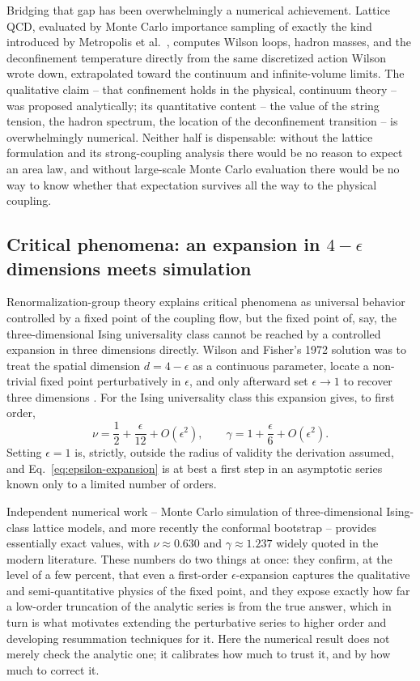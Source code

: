 Bridging that gap has been overwhelmingly a numerical achievement. Lattice QCD,
evaluated by Monte Carlo importance sampling of exactly the kind introduced by
Metropolis et al.\ \cite{Metropolis1953}, computes Wilson loops, hadron masses,
and the deconfinement temperature directly from the same discretized action
Wilson wrote down, extrapolated toward the continuum and infinite-volume
limits. The qualitative claim -- that confinement holds in the physical,
continuum theory -- was proposed analytically; its quantitative content -- the
value of the string tension, the hadron spectrum, the location of the
deconfinement transition -- is overwhelmingly numerical. Neither half is
dispensable: without the lattice formulation and its strong-coupling analysis
there would be no reason to expect an area law, and without large-scale Monte
Carlo evaluation there would be no way to know whether that expectation
survives all the way to the physical coupling.

\subsection{Critical phenomena: an expansion in $4-\epsilon$ dimensions meets simulation}

Renormalization-group theory explains critical phenomena as universal behavior
controlled by a fixed point of the coupling flow, but the fixed point of, say,
the three-dimensional Ising universality class cannot be reached by a
controlled expansion in three dimensions directly. Wilson and Fisher's 1972
solution was to treat the spatial dimension $d = 4-\epsilon$ as a continuous
parameter, locate a non-trivial fixed point perturbatively in $\epsilon$, and
only afterward set $\epsilon \to 1$ to recover three dimensions
\cite{WilsonFisher1972,WilsonKogut1974}. For the Ising universality class this
expansion gives, to first order,
\begin{equation}
\nu = \frac{1}{2} + \frac{\epsilon}{12} + O(\epsilon^2), \qquad \gamma = 1 + \frac{\epsilon}{6} + O(\epsilon^2).
\label{eq:epsilon-expansion}
\end{equation}
Setting $\epsilon=1$ is, strictly, outside the radius of validity the
derivation assumed, and Eq.~\eqref{eq:epsilon-expansion} is at best a first
step in an asymptotic series known only to a limited number of orders.

Independent numerical work -- Monte Carlo simulation of three-dimensional
Ising-class lattice models, and more recently the conformal bootstrap --
provides essentially exact values, with $\nu \approx 0.630$ and $\gamma \approx
1.237$ widely quoted in the modern literature. These numbers do two things at
once: they confirm, at the level of a few percent, that even a first-order
$\epsilon$-expansion captures the qualitative and semi-quantitative physics of
the fixed point, and they expose exactly how far a low-order truncation of the
analytic series is from the true answer, which in turn is what motivates
extending the perturbative series to higher order and developing resummation
techniques for it. Here the numerical result does not merely check the analytic
one; it calibrates how much to trust it, and by how much to correct it.

